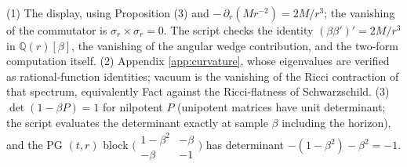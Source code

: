 (1) The display, using Proposition (3) and $-\,\partial_r(Mr^{-2}) = 2M/r^3$; the vanishing of the commutator is $\sigma_r \times \sigma_r = 0$. The script checks the identity $(\beta\beta')' = 2M/r^3$ in $\mathbb{Q}(r)[\beta]$, the vanishing of the angular wedge contribution, and the two-form computation itself. (2) Appendix \ref{app:curvature}, whose eigenvalues are verified as rational-function identities; vacuum is the vanishing of the Ricci contraction of that spectrum, equivalently Fact  against the Ricci-flatness of Schwarzschild. (3) $\det(1 - \beta P) = 1$ for nilpotent $P$ (unipotent matrices have unit determinant; the script evaluates the determinant exactly at sample $\beta$ including the horizon), and the PG $(t,r)$ block $\bigl(\begin{smallmatrix} 1-\beta^2 & -\beta \\ -\beta & -1 \end{smallmatrix}\bigr)$ has determinant $-(1-\beta^2) - \beta^2 = -1$.
